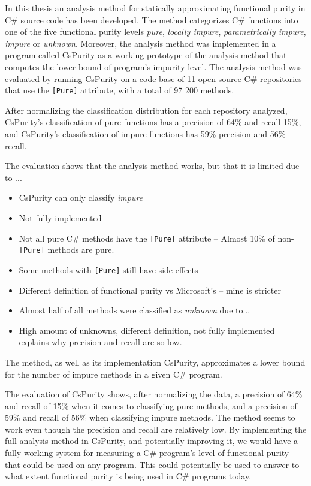 \documentclass[a4paper,12pt]{article}
\begin{document}
In this thesis an analysis method for statically approximating functional purity in C\# source code has been developed. The method categorizes C\# functions into one of the five functional purity levels \textit{pure}, \textit{locally impure}, \textit{parametrically impure}, \textit{impure} or \textit{unknown}. Moreover, the analysis method was implemented in a program called CsPurity as a working prototype of the analysis method that computes the lower bound of program's impurity level. The analysis method was evaluated by running CsPurity on a code base of 11 open source C\# repositories that use the \texttt{[Pure]} attribute, with a total of 97 200 methods.

After normalizing the classification distribution for each repository analyzed, CsPurity's classification of pure functions has a precision of 64\% and recall 15\%, and CsPurity's classification of impure functions has 59\% precision and 56\% recall.

The evaluation shows that the analysis method works, but that it is limited due to ...

\begin{itemize}
  \item CsPurity can only classify \textit{impure}
  \item Not fully implemented
  \item Not all pure C\# methods have the \texttt{[Pure]} attribute -- Almost 10\% of non-\texttt{[Pure]} methods are pure.
  \item Some methods with \texttt{[Pure]} still have side-effects
  \item Different definition of functional purity vs Microsoft's -- mine is stricter
  \item Almost half of all methods were classified as \textit{unknown} due to...
  \item High amount of unknowns, different definition, not fully implemented explains why precision and recall are so low.
\end{itemize}

The method, as well as its implementation CsPurity, approximates a lower bound for the number of impure methods in a given C\# program.

The evaluation of CsPurity shows, after normalizing the data, a precision of 64\% and recall of 15\% when it comes to classifying pure methods, and a precision of 59\% and recall of 56\% when classifying impure methods. The method seems to work even though the precision and recall are relatively low. By implementing the full analysis method in CsPurity, and potentially improving it, we would have a fully working system for measuring a C\# program's level of functional purity that could be used on any program. This could potentially be used to answer to what extent functional purity is being used in C\# programs today.
\end{document}
